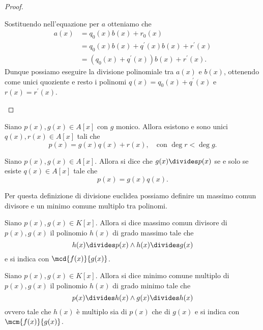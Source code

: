 \begin{proof}
\begin{description}
        Sostituendo nell'equazione per $a$ otteniamo che \begin{align*}
            a(x) &= q_0(x)b(x) + r_0(x)\\
            &= q_0(x)b(x) + q^\prime(x)b(x) + r^\prime(x) \\
            &= (q_0(x) + q^\prime(x))b(x) + r^\prime(x).
        \end{align*} 
        Dunque possiamo eseguire la divisione polinomiale tra $a(x)$ e $b(x)$, ottenendo come unici quoziente e resto i polinomi $q(x) = q_0(x) + q^\prime(x)$ e $r(x) = r^\prime(x)$.
    \end{description}
\end{proof}

\begin{proposition}\label{divisione_polinomi}
    Siano $p(x), g(x) \in A[x]$ con $g$ monico. Allora esistono e sono unici $q(x), r(x) \in A[x]$ tali che \begin{equation}
        p(x) = g(x)q(x) + r(x), \quad \text{con } \deg r < \deg g.
    \end{equation} 
\end{proposition}

\begin{definition}\label{divisione_polinomi_anello}
    Siano $p(x), g(x) \in A[x]$. Allora si dice che $g(x) \divides p(x)$ se e solo se esiste $q(x) \in A[x]$ tale che \[
        p(x) = g(x)q(x).    
    \]
\end{definition}

Per questa definizione di divisione euclidea possiamo definire un massimo comun divisore e un minimo comune multiplo tra polinomi.

\begin{definition}
    Siano $p(x), g(x) \in K[x]$. Allora si dice massimo comun divisore di $p(x), g(x)$ il polinomio $h(x)$ di grado massimo tale che \[
        h(x) \divides p(x) \land h(x) \divides g(x)    
    \] e si indica con $\mcd{f(x)}{g(x)}$.
\end{definition}

\begin{definition}
    Siano $p(x), g(x) \in K[x]$. Allora si dice minimo comune multiplo di $p(x), g(x)$ il polinomio $h(x)$ di grado minimo tale che \[
        p(x) \divides h(x) \land g(x) \divides h(x)  
    \] ovvero tale che $h(x)$ è multiplo sia di $p(x)$ che di $g(x)$ e si indica con $\mcm{f(x)}{g(x)}$.
\end{definition}

